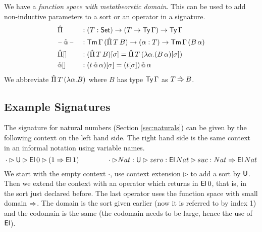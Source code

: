 \documentclass[acmsmall,screen]{acmart}
\begin{document}
We have a \emph{function space with metatheoretic domain}. This can be
used to add non-inductive parameters to a sort or an operator in a
signature.
\begin{alignat*}{5}
  & \hat{\Pi} && : (T:\mathsf{Set})\rightarrow(T\rightarrow\mathsf{Ty}\,\Gamma)\rightarrow\mathsf{Ty}\,\Gamma \\
  & \mathord{\hspace{1pt}\text{--}\hspace{1pt}}\mathop{\hat{\mathop{{\scriptstyle @}}}} \mathord{\hspace{1pt}\text{--}\hspace{1pt}} && : \mathsf{Tm}\,\Gamma\,(\hat{\Pi}\,T\,B)\rightarrow(\alpha:T) \rightarrow\mathsf{Tm}\,\Gamma\,(B\,\alpha) \\
  & {\hat{\Pi}[]} && : (\hat{\Pi}\,T\,B)[\sigma] = \hat{\Pi}\,T\,(\lambda \alpha.(B\,\alpha)[\sigma]) \\
  & {\mathop{\hat{\mathop{{\scriptstyle @}}}}[]} && : (t\mathop{\hat{\mathop{{\scriptstyle @}}}}\alpha)[\sigma] = (t[\sigma])\mathop{\mathop{\hat{\mathop{{\scriptstyle @}}}}}\alpha
\end{alignat*}
We abbreviate $\hat{\Pi}\,T\,(\lambda\alpha.B)$ where $B$ has type
$\mathsf{Ty}\,\Gamma$ as $T\mathbin{\hat{\Rightarrow}} B$.

\subsection{Example Signatures}

The signature for natural numbers (Section \ref{sec:naturals}) can be
given by the following context on the left hand side. The right hand
side is the same context in an informal notation using variable names.
\[
\cdot\rhd\mathsf{U}\rhd\mathsf{El}\,0\rhd (1\Rightarrow \mathsf{El}\,1) \hspace{4em} \cdot\rhd Nat:\mathsf{U}\rhd zero:\mathsf{El}\,Nat\rhd suc:Nat\Rightarrow\mathsf{El}\,Nat
\]
We start with the empty context $\cdot$, use context extension $\rhd$
to add a sort by $\mathsf{U}$. Then we extend the context with an operator
which returns in $\mathsf{El}\,0$, that is, in the sort just declared
before. The last operator uses the function space with small domain
$\Rightarrow$. The domain is the sort given earlier (now it is referred to by
index 1) and the codomain is the same (the codomain needs to be large,
hence the use of $\mathsf{El}$).
\end{document}

